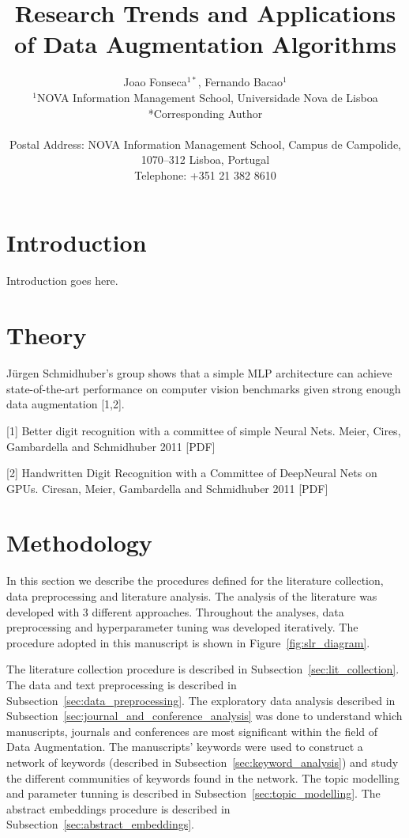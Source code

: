 \documentclass[parskip=full]{scrartcl}
\date{}
\title{%
    Research Trends and Applications of Data Augmentation Algorithms
}
\author{%
	Joao Fonseca\(^{1*}\), Fernando Bacao\(^{1}\)
	\\
	\small{\(^{1}\)NOVA Information Management School, Universidade Nova de Lisboa}
	\\
	\small{*Corresponding Author}
	\\
	\\
	\small{Postal Address: NOVA Information Management School, Campus de
    Campolide, 1070--312 Lisboa, Portugal}
	\\
	\small{Telephone: +351 21 382 8610}
}
\begin{document}
\maketitle

\section{Introduction}

Introduction goes here.

\section{Theory}

Jürgen Schmidhuber's group shows that a simple MLP architecture can achieve
state-of-the-art performance on computer vision benchmarks given strong enough
data augmentation [1,2].

[1] Better digit recognition with a committee of simple Neural Nets. Meier,
Cires, Gambardella and Schmidhuber 2011 [PDF]

[2] Handwritten Digit Recognition with a Committee of DeepNeural Nets on GPUs.
Ciresan, Meier, Gambardella and Schmidhuber 2011 [PDF]

\section{Methodology}

In this section we describe the procedures defined for the literature
collection, data preprocessing and literature analysis. The analysis of the
literature was developed with 3 different approaches. Throughout the
analyses, data preprocessing and hyperparameter tuning was developed
iteratively. The procedure adopted in this manuscript is shown in
Figure~\ref{fig:slr_diagram}.

The literature collection procedure is described in
Subsection~\ref{sec:lit_collection}. The data and text preprocessing is
described in Subsection~\ref{sec:data_preprocessing}. The exploratory data
analysis described in Subsection~\ref{sec:journal_and_conference_analysis} was
done to understand which manuscripts, journals and conferences are most
significant within the field of Data Augmentation. The manuscripts' keywords
were used to construct a network of keywords (described in
Subsection~\ref{sec:keyword_analysis}) and study the different communities of
keywords found in the network. The topic modelling and parameter tunning is described in
Subsection~\ref{sec:topic_modelling}. The abstract embeddings procedure is
described in Subsection~\ref{sec:abstract_embeddings}.
\end{document}
